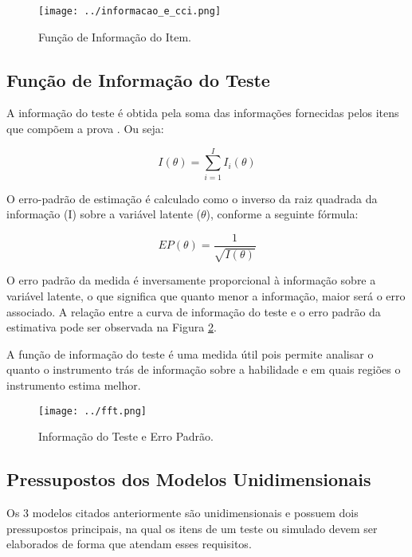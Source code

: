 \begin{figure}[H]
	\centering
	\texttt{[image: ../informacao\_e\_cci.png]}
	\caption{Função de Informação do Item.}
	\label{fig:fii}
\end{figure}

\subsection{Função de Informação do Teste}

A informação do teste é obtida pela soma das informações fornecidas pelos itens que compõem a prova \cite{de2000teoria}. Ou seja:

\begin{equation}\label{eq:info_teste}
I(\theta) = \sum_{i=1}^{I}I_i(\theta)
\end{equation}

 O erro-padrão de estimação é calculado como o inverso da raiz quadrada da informação (I) sobre a variável latente ($\theta$), conforme a seguinte fórmula:

\[
EP(\theta) = \dfrac{1}{\sqrt{I(\theta)}}
\]


O erro padrão da medida é inversamente proporcional à informação sobre a variável latente, o que significa que quanto menor a informação, maior será o erro associado. A relação entre a curva de informação do teste e o erro padrão da estimativa pode ser observada na Figura \ref{fig:fft}.

A função de informação do teste é uma medida útil pois permite analisar o quanto o instrumento trás de informação sobre a habilidade e em quais regiões o instrumento estima melhor.

\begin{figure}[H]
	\centering
	\texttt{[image: ../fft.png]}
	\caption{Informação do Teste e Erro Padrão.}
	\label{fig:fft}
\end{figure}



\subsection{Pressupostos dos Modelos Unidimensionais}

Os 3 modelos citados anteriormente são unidimensionais e possuem dois pressupostos principais, na qual os itens de um teste ou simulado devem ser elaborados de forma que atendam esses requisitos. 

